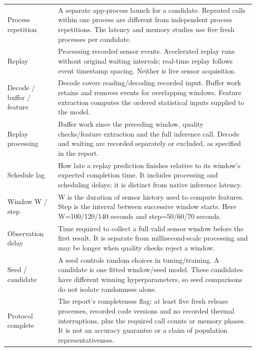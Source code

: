 \documentclass[10pt,a4paper]{article}
\begin{document}
\begin{longtable}{@{}>{\raggedright\arraybackslash}p{}>{\raggedright\arraybackslash}p{}@{}}
Process repetition & A separate app-process launch for a candidate. Repeated calls within one process are different from independent process repetitions. The latency and memory studies use five fresh processes per candidate. \\
Replay & Processing recorded sensor events. Accelerated replay runs without original waiting intervals; real-time replay follows event timestamp spacing. Neither is live sensor acquisition. \\
Decode /\allowbreak{} buffer /\allowbreak{} feature & Decode covers reading/\allowbreak{}decoding recorded input. Buffer work retains and removes events for overlapping windows. Feature extraction computes the ordered statistical inputs supplied to the model. \\
Replay processing & Buffer work since the preceding window, quality checks/\allowbreak{}feature extraction and the full inference call. Decode and waiting are recorded separately or excluded, as specified in the report. \\
Schedule lag & How late a replay prediction finishes relative to its window's expected completion time. It includes processing and scheduling delays; it is distinct from native inference latency. \\
Window W /\allowbreak{} step & W is the duration of sensor history used to compute features. Step is the interval between successive window starts. Here W=100/\allowbreak{}120/\allowbreak{}140 seconds and step=50/\allowbreak{}60/\allowbreak{}70 seconds. \\
Observation delay & Time required to collect a full valid sensor window before the first result. It is separate from millisecond-scale processing and may be longer when quality checks reject a window. \\
Seed /\allowbreak{} candidate & A seed controls random choices in tuning/\allowbreak{}training. A candidate is one fitted window/\allowbreak{}seed model. These candidates have different winning hyperparameters, so seed comparisons do not isolate randomness alone. \\
Protocol complete & The report's completeness flag:\allowbreak{} at least five fresh release processes, recorded code versions and no recorded thermal interruptions, plus the required call counts or memory phases. It is not an accuracy guarantee or a claim of population representativeness. \\
\end{longtable}\endgroup
\end{document}
